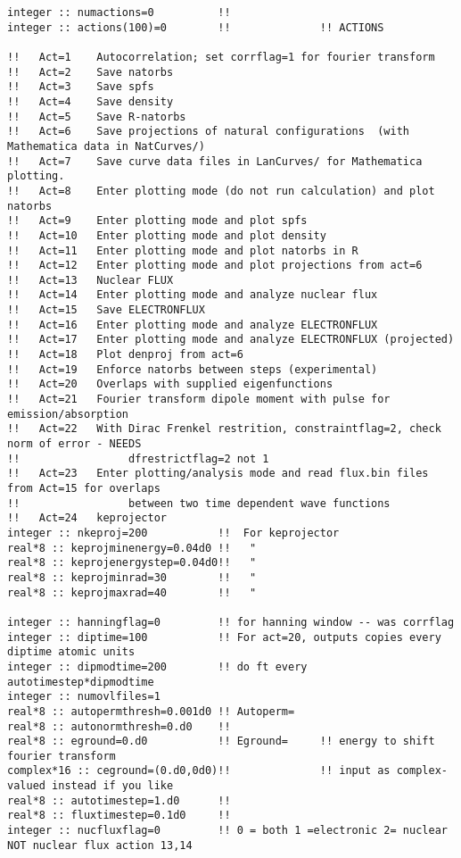 \begin{verbatim}
integer :: numactions=0          !! 
integer :: actions(100)=0        !!              !! ACTIONS

!!   Act=1    Autocorrelation; set corrflag=1 for fourier transform
!!   Act=2    Save natorbs
!!   Act=3    Save spfs
!!   Act=4    Save density
!!   Act=5    Save R-natorbs
!!   Act=6    Save projections of natural configurations  (with Mathematica data in NatCurves/)
!!   Act=7    Save curve data files in LanCurves/ for Mathematica plotting.
!!   Act=8    Enter plotting mode (do not run calculation) and plot natorbs 
!!   Act=9    Enter plotting mode and plot spfs
!!   Act=10   Enter plotting mode and plot density
!!   Act=11   Enter plotting mode and plot natorbs in R
!!   Act=12   Enter plotting mode and plot projections from act=6
!!   Act=13   Nuclear FLUX 
!!   Act=14   Enter plotting mode and analyze nuclear flux
!!   Act=15   Save ELECTRONFLUX
!!   Act=16   Enter plotting mode and analyze ELECTRONFLUX 
!!   Act=17   Enter plotting mode and analyze ELECTRONFLUX (projected)
!!   Act=18   Plot denproj from act=6
!!   Act=19   Enforce natorbs between steps (experimental)
!!   Act=20   Overlaps with supplied eigenfunctions
!!   Act=21   Fourier transform dipole moment with pulse for emission/absorption
!!   Act=22   With Dirac Frenkel restrition, constraintflag=2, check norm of error - NEEDS
!!                 dfrestrictflag=2 not 1
!!   Act=23   Enter plotting/analysis mode and read flux.bin files from Act=15 for overlaps
!!                 between two time dependent wave functions
!!   Act=24   keprojector
integer :: nkeproj=200           !!  For keprojector
real*8 :: keprojminenergy=0.04d0 !!   "
real*8 :: keprojenergystep=0.04d0!!   "
real*8 :: keprojminrad=30        !!   "
real*8 :: keprojmaxrad=40        !!   "

integer :: hanningflag=0         !! for hanning window -- was corrflag
integer :: diptime=100           !! For act=20, outputs copies every diptime atomic units
integer :: dipmodtime=200        !! do ft every autotimestep*dipmodtime
integer :: numovlfiles=1
real*8 :: autopermthresh=0.001d0 !! Autoperm=
real*8 :: autonormthresh=0.d0    !! 
real*8 :: eground=0.d0           !! Eground=     !! energy to shift fourier transform 
complex*16 :: ceground=(0.d0,0d0)!!              !! input as complex-valued instead if you like
real*8 :: autotimestep=1.d0      !!
real*8 :: fluxtimestep=0.1d0     !!
integer :: nucfluxflag=0         !! 0 = both 1 =electronic 2= nuclear  NOT nuclear flux action 13,14
\end{verbatim}
